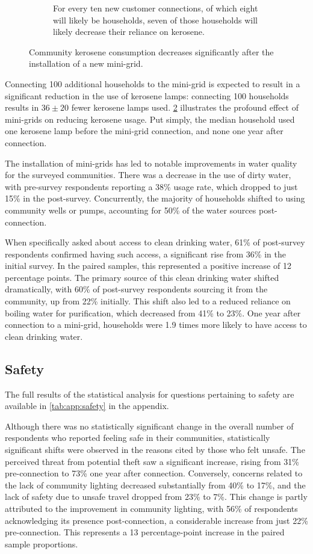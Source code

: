 \begin{figure}[th]
\begin{subfigure}[t]{0.48\textwidth}
		\caption{For every ten new customer connections, of which eight will likely be households, seven of those households will likely decrease their reliance on kerosene.}
		\label{fig:regression-kerosene}
	\end{subfigure}
	\caption{Community kerosene consumption decreases significantly after the installation of a new mini-grid.}
	\label{fig:kerosene}
\end{figure}
Connecting 100 additional households to the mini-grid is expected to result in a significant reduction in the use of kerosene lamps: connecting 100 households results in $36\pm20$ fewer kerosene lamps used. \cref{fig:kerosene} illustrates the profound effect of mini-grids on reducing kerosene usage. Put simply, the median household used one kerosene lamp before the mini-grid connection, and none one year after connection.

The installation of mini-grids has led to notable improvements in water quality for the surveyed communities. There was a decrease in the use of dirty water, with pre-survey respondents reporting a 38\% usage rate, which dropped to just 15\% in the post-survey. Concurrently, the majority of households shifted to using community wells or pumps, accounting for 50\% of the water sources post-connection.

When specifically asked about access to clean drinking water, 61\% of post-survey respondents confirmed having such access, a significant rise from 36\% in the initial survey. In the paired samples, this represented a positive increase of 12 percentage points. The primary source of this clean drinking water shifted dramatically, with 60\% of post-survey respondents sourcing it from the community, up from 22\% initially. This shift also led to a reduced reliance on boiling water for purification, which decreased from 41\% to 23\%. One year after connection to a mini-grid, households were 1.9 times more likely to have access to clean drinking water.

\subsection{Safety}
The full results of the statistical analysis for questions pertaining to safety are available in \cref{tab:app:safety} in the appendix.

Although there was no statistically significant change in the overall number of respondents who reported feeling safe in their communities, statistically significant shifts were observed in the reasons cited by those who felt unsafe. The perceived threat from potential theft saw a significant increase, rising from 31\% pre-connection to 73\% one year after connection. Conversely, concerns related to the lack of community lighting decreased substantially from 40\% to 17\%, and the lack of safety due to unsafe travel dropped from 23\% to 7\%. This change is partly attributed to the improvement in community lighting, with 56\% of respondents acknowledging its presence post-connection, a considerable increase from just 22\% pre-connection. This represents a 13 percentage-point increase in the paired sample proportions.

